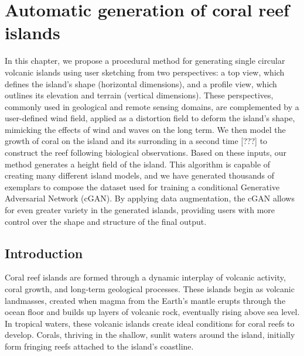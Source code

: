 \resetgraphicspath
{}


\chapter{Automatic generation of coral reef islands}
\label{chap:coral-island}

\abstract 
In this chapter, we propose a procedural method for generating single circular volcanic islands using user sketching from two perspectives: a top view, which defines the island's shape (horizontal dimensions), and a profile view, which outlines its elevation and terrain (vertical dimensions). These perspectives, commonly used in geological and remote sensing domains, are complemented by a user-defined wind field, applied as a distortion field to deform the island's shape, mimicking the effects of wind and waves on the long term. We then model the growth of coral on the island and its surronding in a second time [???] to construct the reef following biological observations. Based on these inputs, our method generates a height field of the island. This algorithm is capable of creating many different island models, and we have generated thousands of exemplars to compose the dataset used for training a conditional Generative Adversarial Network (cGAN). By applying data augmentation, the cGAN allows for even greater variety in the generated islands, providing users with more control over the shape and structure of the final output.
\pagebreak 

\minitoc

\section{Introduction}
\label{sec:coral-island_introduction}

Coral reef islands are formed through a dynamic interplay of volcanic activity, coral growth, and long-term geological processes. These islands begin as volcanic landmasses, created when magma from the Earth's mantle erupts through the ocean floor and builds up layers of volcanic rock, eventually rising above sea level. In tropical waters, these volcanic islands create ideal conditions for coral reefs to develop. Corals, thriving in the shallow, sunlit waters around the island, initially form fringing reefs attached to the island's coastline.

